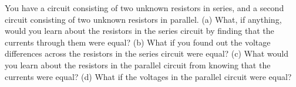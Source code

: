         You have a circuit consisting of two unknown resistors in
        series, and a second circuit consisting of two unknown
        resistors in parallel.  \hwendpart
        (a) What, if anything, would you
        learn about the resistors in the series circuit by finding
        that the currents through them were equal? \hwendpart 
        (b) What if you
        found out the voltage differences across the resistors in
        the series circuit were equal?  \hwendpart
        (c) What would you learn
        about the resistors in the parallel circuit from knowing
        that the currents were equal?  \hwendpart
        (d) What if the voltages in
        the parallel circuit were equal?
